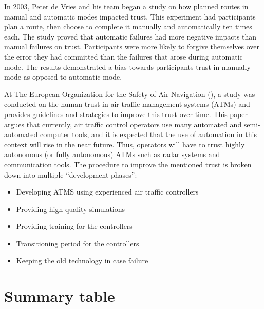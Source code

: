\documentclass[runningheads,a4paper]{llncs}
\begin{document}
In 2003, Peter de Vries and his team began a study on how planned routes in manual and automatic modes impacted trust\cite{de2003effects}.  This experiment had participants plan a route, then choose to complete it manually and automatically ten times each.  The study proved that automatic failures had more negative impacts than manual failures on trust.  Participants were more likely to forgive themselves over the error they had committed than the failures that arose during automatic mode.  The results demonstrated a bias towards participants trust in manually mode as opposed to automatic mode.

At The European Organization for the Safety of Air Navigation (\cite{kelly2003guidelines}), a study was conducted on the human trust in air traffic management systems (ATMs) and provides guidelines and strategies to improve this trust over time. This paper argues that currently, air traffic control operators use many automated and semi-automated computer tools, and it is expected that the use of automation in this context will rise in the near future. Thus, operators will have to trust highly autonomous (or fully autonomous) ATMs such as radar systems and communication tools. The procedure to improve the mentioned trust is broken down into multiple ``development phases'':
\begin{itemize}
    \item Developing ATMS using experienced air traffic controllers
    \item Providing high-quality simulations
    \item Providing training for the controllers
    \item Transitioning period for the controllers
    \item Keeping the old technology in case failure
\end{itemize}


\section{Summary table}
\end{document}
